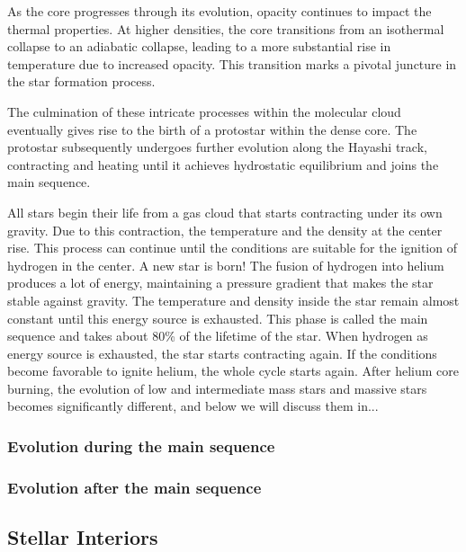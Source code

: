 \documentclass[main.tex]{subfiles}
\begin{document}
    As the core progresses through its evolution, opacity continues to impact the thermal properties. At higher densities, the core transitions from an isothermal collapse to an adiabatic collapse, leading to a more substantial rise in temperature due to increased opacity. This transition marks a pivotal juncture in the star formation process.
    
    The culmination of these intricate processes within the molecular cloud eventually gives rise to the birth of a protostar within the dense core. The protostar subsequently undergoes further evolution along the Hayashi track, contracting and heating until it achieves hydrostatic equilibrium and joins the main sequence.





    All stars begin their life from a gas cloud that starts contracting
    under its own gravity. Due to this contraction, the temperature and the
    density at the center rise. This process can continue until the conditions
    are suitable for the ignition of hydrogen in the center. A new star is born! The fusion of hydrogen into helium produces a lot of energy, maintaining a pressure gradient that makes the star stable against gravity. The temperature and density inside the star remain almost constant until this energy source is exhausted. This phase is called the main sequence and takes about 80\% of the lifetime of the star. When hydrogen as energy source is exhausted, the star starts contracting again. If the conditions become favorable to ignite helium, the whole cycle starts again. After helium core burning, the evolution of low and intermediate mass stars and massive stars becomes significantly different, and below we will discuss them in...

    \subsubsection{Evolution during the main sequence}

    \subsubsection{Evolution after the main sequence}

    \subsection{Stellar Interiors}
    
\end{document}
